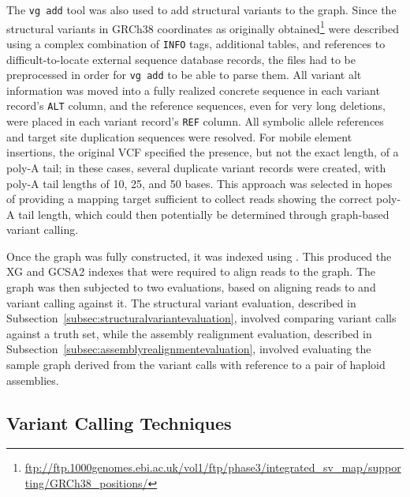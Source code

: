 \begin{sloppypar}
The \texttt{vg add} tool was also used to add structural variants to the graph. Since the structural variants in GRCh38 coordinates as originally obtained\footnote{\url{ftp://ftp.1000genomes.ebi.ac.uk/vol1/ftp/phase3/integrated_sv_map/supporting/GRCh38_positions/}} were described using a complex combination of \texttt{INFO} tags, additional tables, and references to difficult-to-locate external sequence database records, the files had to be preprocessed in order for \texttt{vg add} to be able to parse them. All variant alt information was moved into a fully realized concrete sequence in each variant record's \texttt{ALT} column, and the reference sequences, even for very long deletions, were placed in each variant record's \texttt{REF} column. All symbolic allele references and target site duplication sequences were resolved. For mobile element insertions, the original VCF specified the presence, but not the exact length, of a poly-A tail; in these cases, several duplicate variant records were created, with poly-A tail lengths of 10, 25, and 50 bases. This approach was selected in hopes of providing a mapping target sufficient to collect reads showing the correct poly-A tail length, which could then potentially be determined through graph-based variant calling.
\end{sloppypar}

Once the graph was fully constructed, it was indexed using \vg. This produced the XG and GCSA2 indexes that were required to align reads to the graph. The graph was then subjected to two evaluations, based on aligning reads to and variant calling against it. The structural variant evaluation, described in Subsection~\ref{subsec:structuralvariantevaluation}, involved comparing variant calls against a truth set, while the assembly realignment evaluation, described in Subsection~\ref{subsec:assemblyrealignmentevaluation}, involved evaluating the sample graph derived from the variant calls with reference to a pair of haploid assemblies.

\subsection{Variant Calling Techniques}
\label{subsec:variantcalling}

